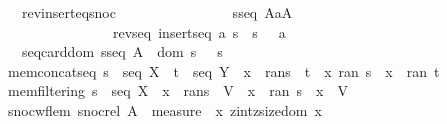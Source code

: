 \begin{isabellebody}
\isanewline
\ \ rev{\isacharunderscore}insert{\isacharunderscore}eq{\isacharunderscore}snoc{\isacharcolon}\ \isanewline
\ \ \ \ \ \ \ \ \ \ \ \ \ \ {\isachardoublequoteopen}{\isacharbrackleft}{\isacharbar}\ s{\isacharcolon}seq\ A{\isacharsemicolon}a{\isacharcolon}A\ {\isacharbar}{\isacharbrackright}\ {\isacharequal}{\isacharequal}{\isachargreater}\ \isanewline
\ \ \ \ \ \ \ \ \ \ \ \ \ \ \ revseq\ {\isacharparenleft}insertseq\ a\ s{\isacharparenright}\ {\isacharequal}\ s\ {\isacharpercent}{\isacharampersand}{\isacharcircum}\ {\isacharpercent}{\isacharless}\ a\ {\isacharpercent}{\isachargreater}\ {\isachardoublequoteclose}\isanewline
\isanewline
\ \ seq{\isacharunderscore}card{\isacharunderscore}dom{\isacharcolon}\ {\isachardoublequoteopen}s{\isacharcolon}seq\ A\ {\isacharequal}{\isacharequal}{\isachargreater}\ {\isacharhash}{\isacharparenleft}dom\ s{\isacharparenright}\ {\isacharequal}\ {\isacharhash}\ s{\isachardoublequoteclose}\isanewline
\isanewline
\isanewline
\isanewline
\isanewline
\isanewline
mem{\isacharunderscore}concatseq{\isacharcolon}\ {\isachardoublequoteopen}s\ {\isacharcolon}\ seq\ X\ {\isacharminus}{\isacharminus}{\isachargreater}\ t\ {\isacharcolon}\ seq\ Y\ {\isacharminus}{\isacharminus}{\isachargreater}\ x\ {\isacharcolon}\ {\isacharparenleft}ran{\isacharparenleft}s\ {\isacharpercent}{\isacharampersand}{\isacharcircum}\ t{\isacharparenright}{\isacharparenright}\ {\isacharequal}\ {\isacharparenleft}x{\isacharcolon}\ {\isacharparenleft}ran\ s{\isacharparenright}\ {\isacharbar}\ x\ {\isacharcolon}\ {\isacharparenleft}ran\ t{\isacharparenright}{\isacharparenright}{\isachardoublequoteclose}\isanewline
mem{\isacharunderscore}filtering{\isacharcolon}\ {\isachardoublequoteopen}s\ {\isacharcolon}\ seq\ X\ {\isacharminus}{\isacharminus}{\isachargreater}\ x\ {\isacharcolon}\ {\isacharparenleft}ran{\isacharparenleft}s\ {\isacharpercent}{\isacharbar}{\isacharbackquote}\ V{\isacharparenright}{\isacharparenright}\ {\isacharequal}\ {\isacharparenleft}x\ {\isacharcolon}\ {\isacharparenleft}ran\ s{\isacharparenright}\ {\isacharampersand}\ {\isacharparenleft}x\ {\isacharcolon}\ V{\isacharparenright}{\isacharparenright}{\isachardoublequoteclose}\isanewline
snoc{\isacharunderscore}wf{\isacharunderscore}lem{\isacharcolon}\ {\isachardoublequoteopen}snoc{\isacharunderscore}rel\ A\ {\isacharless}{\isacharequal}\ measure\ {\isacharparenleft}{\isacharpercent}\ x{\isachardot}\ zint{\isacharparenleft}zsize{\isacharparenleft}dom\ x{\isacharparenright}{\isacharparenright}{\isacharparenright}{\isachardoublequoteclose}\isanewline
\isanewline
\isanewline
\isanewline
{}\isamarkupfalse%

\end{isabellebody}
